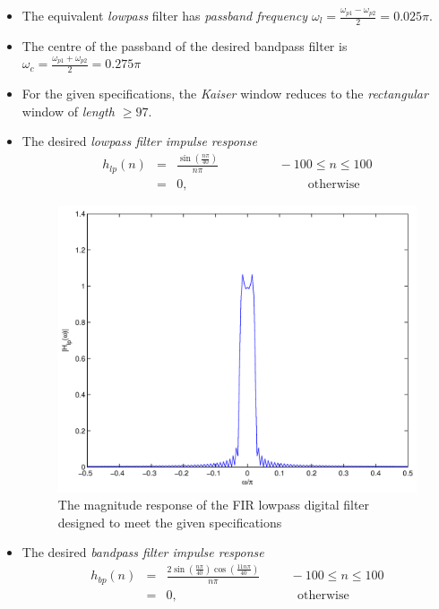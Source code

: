 \documentclass[journal,12pt,twocolumn]{IEEEtran}
\theoremstyle{remark}
\begin{document}
\begin{itemize}
\item The equivalent {\em lowpass} filter has {\em passband frequency $\omega_l = \frac{\omega_{p1} - \omega_{p2}}{2} = 0.025\pi$}.

\item The centre of the passband of the desired bandpass filter is $\omega_c = \frac{\omega_{p1} + \omega_{p2}}{2} = 0.275\pi$
\item For the given specifications, the {\em Kaiser} window reduces to the {\em rectangular} window of {\em length
$\geq 97$}.
\item The desired {\em lowpass filter impulse response}
\begin{eqnarray}
\label{firlpfinal}
h_{lp}(n) &=& \frac{\sin(\frac{n\pi}{40})}{n\pi} \hspace{2cm} -100 \leq n \leq 100 \nonumber \\
&=& 0, \hspace{4cm} \mbox{otherwise} \nonumber
\end{eqnarray}

\begin{figure}[htbp] 
\centering
\includegraphics[width=\columnwidth]{figs/PNG/FIR/fig5.png}
\caption{The magnitude response of the FIR lowpass digital filter designed to meet the given specifications}
\label{fig:fig5}
\end{figure}

\item The desired {\em bandpass filter impulse response}
\begin{eqnarray}
\label{firbpfinal}
h_{bp}(n) &=& \frac{2\sin(\frac{n\pi}{40}) \cos(\frac{11n\pi}{40})}{n\pi} \hspace{1cm} -100 \leq n \leq 100 \nonumber \\
&=& 0, \hspace{4cm} \mbox{otherwise}\nonumber
\end{eqnarray}
\end{itemize}
\end{document}
